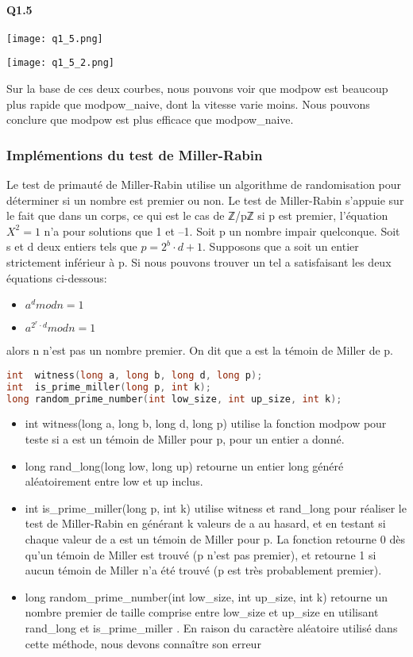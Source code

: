 \documentclass{article}
\begin{document}
\paragraph*{Q1.5}
\centerline{\texttt{[image: q1\_5.png]}}
\centerline{\texttt{[image: q1\_5\_2.png]}}
\newline
Sur la base de ces deux courbes, nous pouvons voir que modpow est beaucoup plus rapide que modpow\_naive, dont la vitesse varie moins. Nous pouvons conclure que modpow est plus efficace que modpow\_naive.
\subsubsection{Implémentions du test de Miller-Rabin}
Le test de primauté de Miller-Rabin utilise un algorithme de randomisation pour déterminer si un nombre est premier ou non.
Le test de Miller-Rabin s'appuie sur le fait que dans un corps, ce qui est le cas de ℤ/pℤ si p est premier, l'équation $X^2 = 1$ n'a pour solutions que 1 et –1. 
Soit p un nombre impair quelconque. Soit s et d deux entiers tels que $p = 2^b\cdot d + 1$. Supposons que a soit un entier strictement inférieur à p. \newline
Si nous pouvons trouver un tel a satisfaisant les deux équations ci-dessous:
\begin{itemize}
\item $a^d mod n=1$
\item $a^{2^r\cdot d} mod n =1$
\end{itemize}

alors n n'est pas un nombre premier. On dit que a est la témoin de Miller de p.\newline
\begin{lstlisting}[language={C}]
int  witness(long a, long b, long d, long p);
int  is_prime_miller(long p, int k);
long random_prime_number(int low_size, int up_size, int k);
\end{lstlisting}
\begin{itemize}
\item int witness(long a, long b, long d, long p) utilise la fonction modpow pour teste si a est un témoin de Miller pour
p, pour un entier a donné.
\item long rand\_long(long low, long up) retourne un entier long généré aléatoirement entre low et up inclus.
\item int is\_prime\_miller(long p, int k) utilise witness et rand\_long pour réaliser le test de Miller-Rabin en générant k valeurs de a au hasard, et en testant si chaque valeur de a est un témoin de Miller pour p. La fonction retourne 0 dès qu’un témoin de Miller est trouvé (p n’est pas premier), et retourne 1 si aucun témoin de Miller n’a été trouvé (p est très probablement premier).
\item long random\_prime\_number(int low\_size, int up\_size, int k) retourne un nombre premier de taille comprise entre low\_size et up\_size en utilisant rand\_long et is\_prime\_miller  .
En raison du caractère aléatoire utilisé dans cette méthode, nous devons connaître son erreur
\end{itemize}
\end{document}
